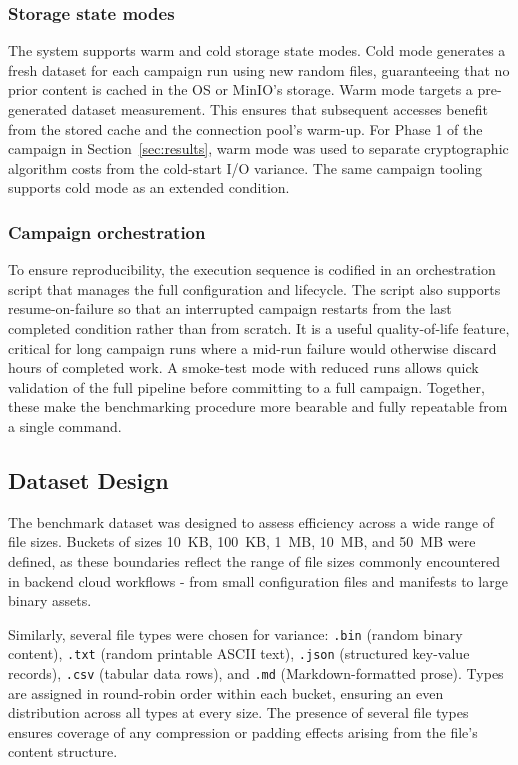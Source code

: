 \documentclass[12pt,a4paper]{article}
\begin{document}
\subsubsection{Storage state modes} The system supports warm and cold storage state modes. Cold mode generates a fresh dataset for each campaign run using new random files, guaranteeing that no prior content is cached in the OS or MinIO's storage. Warm mode targets a pre-generated dataset measurement. This ensures that subsequent accesses benefit from the stored cache and the connection pool's warm-up. For Phase 1 of the campaign in Section~\ref{sec:results}, warm mode was used to separate cryptographic algorithm costs from the cold-start I/O variance. The same campaign tooling supports cold mode as an extended condition.

\subsubsection{Campaign orchestration} To ensure reproducibility, the execution sequence is codified in an orchestration script that manages the full configuration and lifecycle. The script also supports resume-on-failure so that an interrupted campaign restarts from the last completed condition rather than from scratch. It is a useful quality-of-life feature, critical for long campaign runs where a mid-run failure would otherwise discard hours of completed work. A smoke-test mode with reduced runs allows quick validation of the full pipeline before committing to a full campaign. Together, these make the benchmarking procedure more bearable and fully repeatable from a single command.

\subsection{Dataset Design}
\label{sec:dataset}

The benchmark dataset was designed to assess efficiency across a wide range of file sizes. Buckets of sizes 10~KB, 100~KB, 1~MB, 10~MB, and 50~MB were defined, as these boundaries reflect the range of file sizes commonly encountered in backend cloud workflows - from small configuration files and manifests to large binary assets.

Similarly, several file types were chosen for variance: \texttt{.bin} (random binary content), \texttt{.txt} (random printable ASCII text), \texttt{.json} (structured key-value records), \texttt{.csv} (tabular data rows), and \texttt{.md} (Markdown-formatted prose). Types are assigned in round-robin order within each bucket, ensuring an even distribution across all types at every size. The presence of several file types ensures coverage of any compression or padding effects arising from the file's content structure.
\end{document}
